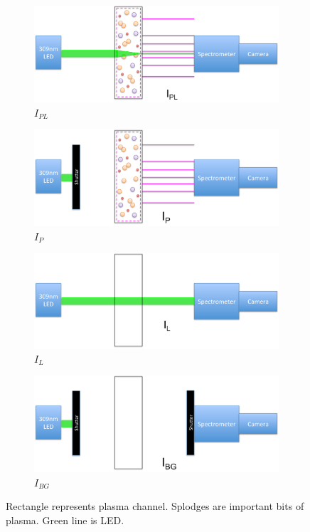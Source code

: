 \documentclass[11pt, oneside]{article}   	%
\begin{document}
\begin{figure}
	\begin{subfigure}{0.2\textwidth}
  	  	\includegraphics[width=\textwidth]{Figures/Ipl.pdf}
   	 	\caption{$I_{PL}$}
    		\label{subfig:Ipl}
	\end{subfigure}
	\hfill
	\begin{subfigure}{0.2\textwidth}
    		\includegraphics[width=\textwidth]{Figures/Ip.pdf}
    		\caption{$I_{P}$}
    		\label{subfig:Ip}
	\end{subfigure}
	\hfill
	\begin{subfigure}{0.2\textwidth}
		\includegraphics[width=\textwidth]{Figures/Il.pdf}
    		\caption{$I_{L}$}
		\label{subfig:Il}
	\end{subfigure}
	\hfill
    	\begin{subfigure}{0.2\textwidth}
    		\includegraphics[width=\textwidth]{Figures/Ibg.pdf}
    		\caption{$I_{BG}$}
    		\label{subfig:Ibg}
	\end{subfigure}
	\caption{Rectangle represents plasma channel. Splodges are important bits of plasma. Green line is LED.}
\end{figure}
\end{document}
